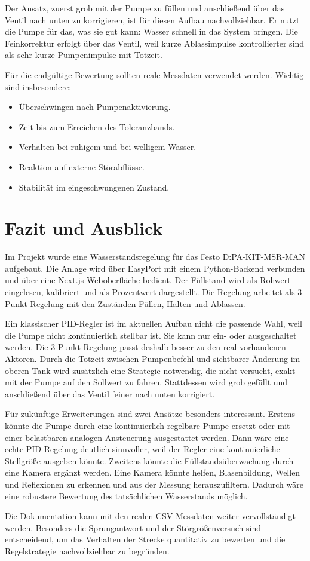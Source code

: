\documentclass[12pt,a4paper]{scrartcl}
\begin{document}
Der Ansatz, zuerst grob mit der Pumpe zu füllen und anschließend über das Ventil nach unten zu korrigieren, ist für diesen Aufbau nachvollziehbar. Er nutzt die Pumpe für das, was sie gut kann: Wasser schnell in das System bringen. Die Feinkorrektur erfolgt über das Ventil, weil kurze Ablassimpulse kontrollierter sind als sehr kurze Pumpenimpulse mit Totzeit.

Für die endgültige Bewertung sollten reale Messdaten verwendet werden. Wichtig sind insbesondere:

\begin{itemize}
  \item Überschwingen nach Pumpenaktivierung.
  \item Zeit bis zum Erreichen des Toleranzbands.
  \item Verhalten bei ruhigem und bei welligem Wasser.
  \item Reaktion auf externe Störabflüsse.
  \item Stabilität im eingeschwungenen Zustand.
\end{itemize}

\section{Fazit und Ausblick}

Im Projekt wurde eine Wasserstandsregelung für das Festo D:PA-KIT-MSR-MAN aufgebaut. Die Anlage wird über EasyPort mit einem Python-Backend verbunden und über eine Next.js-Weboberfläche bedient. Der Füllstand wird als Rohwert eingelesen, kalibriert und als Prozentwert dargestellt. Die Regelung arbeitet als 3-Punkt-Regelung mit den Zuständen Füllen, Halten und Ablassen.

Ein klassischer PID-Regler ist im aktuellen Aufbau nicht die passende Wahl, weil die Pumpe nicht kontinuierlich stellbar ist. Sie kann nur ein- oder ausgeschaltet werden. Die 3-Punkt-Regelung passt deshalb besser zu den real vorhandenen Aktoren. Durch die Totzeit zwischen Pumpenbefehl und sichtbarer Änderung im oberen Tank wird zusätzlich eine Strategie notwendig, die nicht versucht, exakt mit der Pumpe auf den Sollwert zu fahren. Stattdessen wird grob gefüllt und anschließend über das Ventil feiner nach unten korrigiert.

Für zukünftige Erweiterungen sind zwei Ansätze besonders interessant. Erstens könnte die Pumpe durch eine kontinuierlich regelbare Pumpe ersetzt oder mit einer belastbaren analogen Ansteuerung ausgestattet werden. Dann wäre eine echte PID-Regelung deutlich sinnvoller, weil der Regler eine kontinuierliche Stellgröße ausgeben könnte. Zweitens könnte die Füllstandsüberwachung durch eine Kamera ergänzt werden. Eine Kamera könnte helfen, Blasenbildung, Wellen und Reflexionen zu erkennen und aus der Messung herauszufiltern. Dadurch wäre eine robustere Bewertung des tatsächlichen Wasserstands möglich.

Die Dokumentation kann mit den realen CSV-Messdaten weiter vervollständigt werden. Besonders die Sprungantwort und der Störgrößenversuch sind entscheidend, um das Verhalten der Strecke quantitativ zu bewerten und die Regelstrategie nachvollziehbar zu begründen.
\end{document}
